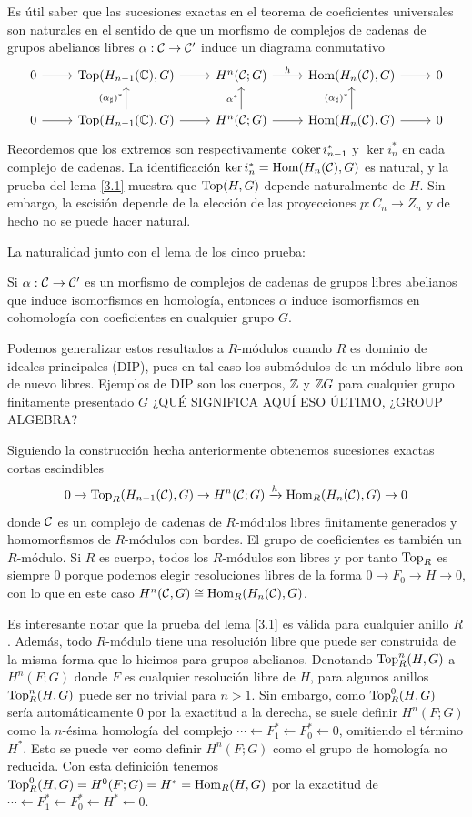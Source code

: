 \documentclass[TA.tex]{subfiles}
\begin{document}
Es útil saber que las sucesiones exactas en el teorema de coeficientes universales son naturales en el sentido de que un morfismo de complejos de cadenas de grupos abelianos libres $\alpha:\mathcal{C}\to\mathcal{C}'$ induce un diagrama conmutativo
\[
\begin{tikzcd}
0\arrow[r] & \Ext(H_{n-1}(\C),G)\arrow[r] & H^n(\CC;G)\arrow[r, "h"] & \Hom(H_n(\CC),G)\arrow[r] & 0\\
0\arrow[r] & \Ext(H_{n-1}(\C),G)\arrow[u, "(\alpha_\sharp)^*"]\arrow[r] & H^n(\CC;G)\arrow[u, "\alpha^*"]\arrow[r] & \Hom(H_n(\CC),G)\arrow[u, "(\alpha_\sharp)^*"]\arrow[r] & 0
\end{tikzcd}
\]
Recordemos que los extremos son respectivamente $\operatorname{coker} i_{n-1}^*$ y $\ker i_n^*$ en cada complejo de cadenas. La identificación $\ker i_n^*=\operatorname{Hom}(H_n(\mathcal{C}),G)$ es natural, y la prueba del lema \ref{3.1} muestra que $\operatorname{Top}(H,G)$ depende naturalmente de $H$. Sin embargo, la escisión depende de la elección de las proyecciones $p:C_n\to Z_n$ y de hecho no se puede hacer natural.

La naturalidad junto con el lema de los cinco prueba:
\begin{coro}
Si $\alpha:\mathcal{C}\to\mathcal{C}'$ es un morfismo de complejos de cadenas de grupos libres abelianos que induce isomorfismos en homología, entonces $\alpha$ induce isomorfismos en cohomología con coeficientes en cualquier grupo $G$.
\end{coro}

Podemos generalizar estos resultados a $R$-módulos cuando $R$ es dominio de ideales principales (DIP), pues en tal caso los submódulos de un módulo libre son de nuevo libres. Ejemplos de DIP son los cuerpos, $\mathbb{Z}$ y $\mathbb{Z} G$ para cualquier grupo finitamente presentado $G$ ¿QUÉ SIGNIFICA AQUÍ ESO ÚLTIMO, ¿GROUP ALGEBRA?

Siguiendo la construcción hecha anteriormente obtenemos sucesiones exactas cortas escindibles
\[
0\to\operatorname{Top}_R(H_{n-1}(\mathcal{C}),G)\to H^n(\mathcal{C};G)\xrightarrow{h}\operatorname{Hom}_R(H_n(\mathcal{C}),G)\to 0
\]
donde $\mathcal{C}$ es un complejo de cadenas de $R$-módulos libres finitamente generados y homomorfismos de $R$-módulos con bordes. El grupo de coeficientes es también un $R$-módulo. Si $R$ es cuerpo, todos los $R$-módulos son libres y por tanto $\operatorname{Top}_R$ es siempre 0 porque podemos elegir resoluciones libres de la forma $0\to F_0\to H\to 0$, con lo que en este caso $H^n(\mathcal{C},G)\cong\operatorname{Hom}_R(H_n(\mathcal{C}),G)$.

Es interesante notar que la prueba del lema \ref{3.1} es válida para cualquier anillo $R$. Además, todo $R$-módulo tiene una resolución libre que puede ser construida de la misma forma que lo hicimos para grupos abelianos. Denotando $\operatorname{Top}^n_R(H,G)$ a $H^n(F;G)$ donde $F$ es cualquier resolución libre de $H$, para algunos anillos $\operatorname{Top}^n_R(H,G)$ puede ser no trivial para $n>1$. Sin embargo, como $\operatorname{Top}^0_R(H,G)$ sería automáticamente 0 por la exactitud a la derecha, se suele definir $H^n(F;G)$ como la $n$-ésima homología del complejo $\cdots\leftarrow F_1^*\leftarrow F_0^*\leftarrow 0$, omitiendo el término $H^*$. Esto se puede ver como definir $H^n(F;G)$ como el grupo de homología no reducida. Con esta definición tenemos $\operatorname{Top}^0_R(H,G)=H^0(F;G)=H^*=\operatorname{Hom}_R(H,G)$ por la exactitud de $\cdots\leftarrow F_1^*\leftarrow F_0^*\leftarrow H^*\leftarrow 0$. 
\end{document}
